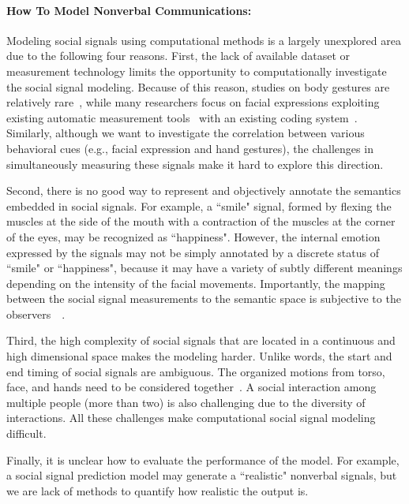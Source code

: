 \paragraph{How To Model Nonverbal Communications:} 
Modeling social signals using computational methods is a largely unexplored area due to the following four reasons. First, the lack of available dataset or measurement technology limits the opportunity to computationally investigate the social signal modeling. Because of this reason, studies on body gestures are relatively rare~\cite{gunes2006bimodal, banziger2012introducing, de2004modeling}, while many researchers focus on facial expressions exploiting existing automatic measurement tools~\cite{Torre15} with an existing coding system~\cite{ekman1977facial}. Similarly, although we want to investigate the correlation between various behavioral cues (e.g., facial expression and hand gestures), the challenges in simultaneously measuring these signals make it hard to explore this direction.

Second, there is no good way to represent and objectively annotate the semantics embedded in social signals. For example, a ``smile" signal, formed by flexing the muscles at the side of the mouth with a contraction of the muscles at the corner of the eyes, may be recognized as ``happiness". However, the internal emotion expressed by the signals may not be simply annotated by a discrete status of ``smile" or ``happiness", because it may have a variety of subtly different meanings depending on the intensity of the facial movements. Importantly, the mapping between the social signal measurements to the semantic space is subjective to the observers~~\cite{steidl2005all}.

Third, the high complexity of social signals that are located in a continuous and high dimensional space makes the modeling harder. Unlike words, the start and end timing of social signals are ambiguous. The organized motions from torso, face, and hands need to be considered together~\cite{aviezer2008angry,barrett2011context}. A social interaction among multiple people (more than two) is also challenging due to the diversity of interactions. All these challenges make computational social signal modeling difficult.

Finally, it is unclear how to evaluate the performance of the model. For example, a social signal prediction model may generate a ``realistic" nonverbal signals, but we are lack of methods to quantify how realistic the output is.

